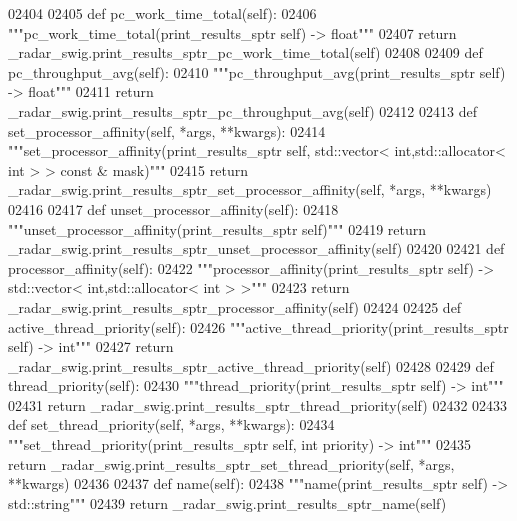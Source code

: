 \begin{DoxyCode}
{{{{{{{{{02404 
02405     \textcolor{keyword}{def }pc_work_time_total(self):
02406         \textcolor{stringliteral}{"""pc\_work\_time\_total(print\_results\_sptr self) -> float"""}
02407         \textcolor{keywordflow}{return} \_radar\_swig.print\_results\_sptr\_pc\_work\_time\_total(self)
02408 
02409     \textcolor{keyword}{def }pc_throughput_avg(self):
02410         \textcolor{stringliteral}{"""pc\_throughput\_avg(print\_results\_sptr self) -> float"""}
02411         \textcolor{keywordflow}{return} \_radar\_swig.print\_results\_sptr\_pc\_throughput\_avg(self)
02412 
02413     \textcolor{keyword}{def }set_processor_affinity(self, *args, **kwargs):
02414         \textcolor{stringliteral}{"""set\_processor\_affinity(print\_results\_sptr self, std::vector< int,std::allocator< int > > const &
       mask)"""}
02415         \textcolor{keywordflow}{return} \_radar\_swig.print\_results\_sptr\_set\_processor\_affinity(self, *args, **kwargs)
02416 
02417     \textcolor{keyword}{def }unset_processor_affinity(self):
02418         \textcolor{stringliteral}{"""unset\_processor\_affinity(print\_results\_sptr self)"""}
02419         \textcolor{keywordflow}{return} \_radar\_swig.print\_results\_sptr\_unset\_processor\_affinity(self)
02420 
02421     \textcolor{keyword}{def }processor_affinity(self):
02422         \textcolor{stringliteral}{"""processor\_affinity(print\_results\_sptr self) -> std::vector< int,std::allocator< int > >"""}
02423         \textcolor{keywordflow}{return} \_radar\_swig.print\_results\_sptr\_processor\_affinity(self)
02424 
02425     \textcolor{keyword}{def }active_thread_priority(self):
02426         \textcolor{stringliteral}{"""active\_thread\_priority(print\_results\_sptr self) -> int"""}
02427         \textcolor{keywordflow}{return} \_radar\_swig.print\_results\_sptr\_active\_thread\_priority(self)
02428 
02429     \textcolor{keyword}{def }thread_priority(self):
02430         \textcolor{stringliteral}{"""thread\_priority(print\_results\_sptr self) -> int"""}
02431         \textcolor{keywordflow}{return} \_radar\_swig.print\_results\_sptr\_thread\_priority(self)
02432 
02433     \textcolor{keyword}{def }set_thread_priority(self, *args, **kwargs):
02434         \textcolor{stringliteral}{"""set\_thread\_priority(print\_results\_sptr self, int priority) -> int"""}
02435         \textcolor{keywordflow}{return} \_radar\_swig.print\_results\_sptr\_set\_thread\_priority(self, *args, **kwargs)
02436 
02437     \textcolor{keyword}{def }name(self):
02438         \textcolor{stringliteral}{"""name(print\_results\_sptr self) -> std::string"""}
02439         \textcolor{keywordflow}{return} \_radar\_swig.print\_results\_sptr\_name(self)
}}}}}}}}}
\end{DoxyCode}
